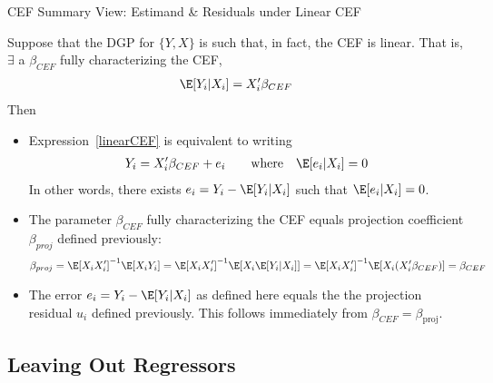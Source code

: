 \documentclass[aspectratio=169, handout]{beamer}
\begin{document}
{\footnotesize
\begin{frame}{CEF Summary View: Estimand \& Residuals under Linear CEF}

Suppose that the DGP for $\{Y,X\}$ is such that, in fact, the CEF is
\alert{linear}.
That is, $\exists$ a $\beta_{CEF}$
\alert{fully characterizing} the CEF,
\begin{align}
  \E[Y_i|X_i]
  =
  X_i'\beta_{CEF}
  \label{linearCEF}
\end{align}
Then
\begin{itemize}
  \item
    Expression~\ref{linearCEF} is equivalent to writing
    \begin{align*}
      Y_i
      =
      X_i'\beta_{CEF}
      +
      e_i
      \qquad\text{where}\quad
      \E[e_i|X_i]=0
    \end{align*}
    In other words,
    there exists $e_i=Y_i-\E[Y_i|X_i]$ such that
    $\E[e_i|X_i]=0$.

  \item The parameter $\beta_{CEF}$ fully characterizing the CEF equals
    projection coefficient $\beta_{proj}$ defined previously:
    \begin{align*}
      \beta_{proj}
      =
      \E[X_iX_i']^{-1}
      \E[X_iY_i]
      =
      \E[X_iX_i']^{-1}
      \E[X_i\E[Y_i|X_i]]
      =
      \E[X_iX_i']^{-1}
      \E[X_i(X_i'\beta_{CEF})]
      =
      \beta_{CEF}
    \end{align*}

  \item
    The error $e_i=Y_i-\E[Y_i|X_i]$ as defined here equals
    the the projection residual $u_i$ defined previously.
    This follows immediately from $\beta_{CEF}=\beta_{\text{proj}}$.
\end{itemize}
\end{frame}
}



\subsection{Leaving Out Regressors}
\end{document}
